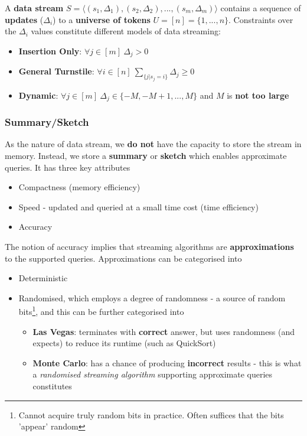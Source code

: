 \documentclass[a4paper]{article}
\begin{document}
A \textbf{data stream} $S = \langle(s_1, \Delta_1),(s_2, \Delta_2),...,(s_m, \Delta_m)\rangle$ contains a sequence of \textbf{updates} ($\Delta_i$) to a \textbf{universe of tokens} $U = [n] = \{1,...,n\}$. Constraints over the $\Delta_i$ values constitute different models of data streaming:
\begin{itemize}
    \item \textbf{Insertion Only}: $\forall j \in [m]\ \Delta_j > 0$
    \item \textbf{General Turnstile}: $\forall i \in [n]\ \sum_{\{j | s_j = i\}}\Delta_j \geq 0$
    \item \textbf{Dynamic}: $\forall j \in [m]\ \Delta_j \in \{-M,-M+1,...,M\}$ and $M$ is \textbf{not too large}
\end{itemize}

\subsubsection{Summary/Sketch}

As the nature of data stream, we \textbf{do not} have the capacity to store the stream in memory. Instead, we store a \textbf{summary} or \textbf{sketch} which enables approximate queries. It has three key attributes
\begin{itemize}
    \item Compactness (memory efficiency)
    \item Speed - updated and queried at a small time cost (time efficiency)
    \item Accuracy
\end{itemize}
The notion of accuracy implies that streaming algorithms are \textbf{approximations} to the supported queries. Approximations can be categorised into
\begin{itemize}
    \item Deterministic
    \item Randomised, which employs a degree of randomness - a source of random bits\footnote{Cannot acquire truly random bits in practice. Often suffices that the bits 'appear' random}, and this can be further categorised into
    \begin{itemize}
        \item \textbf{Las Vegas}: terminates with \textbf{correct} answer, but uses randomness (and expects) to reduce its runtime (such as QuickSort)
        \item \textbf{Monte Carlo}: has a chance of producing \textbf{incorrect} results - this is what a \textit{randomised streaming algorithm} supporting approximate queries constitutes
    \end{itemize}
\end{itemize}
\end{document}
